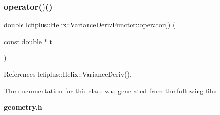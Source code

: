 \subsubsection{operator()()}
{\footnotesize\ttfamily double lcfiplus\+::\+Helix\+::\+Variance\+Deriv\+Functor\+::operator() (\begin{DoxyParamCaption}\item[{const double $\ast$}]{t }\end{DoxyParamCaption})\hspace{0.3cm}{\ttfamily [inline]}}



References lcfiplus\+::\+Helix\+::\+Variance\+Deriv().



The documentation for this class was generated from the following file\+:\begin{DoxyCompactItemize}
\item 
\textbf{ geometry.\+h}\end{DoxyCompactItemize}
